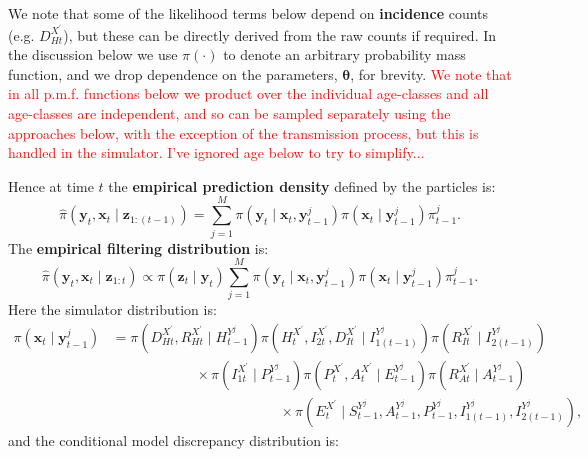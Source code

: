\documentclass[a4paper]{article}
\newcommand{\btheta}{\bm{\theta}}
\newcommand{\bx}{\bm{x}}
\newcommand{\by}{\bm{y}}
\newcommand{\bz}{\bm{z}}
\begin{document}
We note that some of the likelihood terms below depend on \textbf{incidence} counts (e.g. $D^{X^\prime}_{Ht}$), but these can be directly derived from the raw counts if required. In the discussion below we use $\pi\left(\cdot\right)$ to denote an arbitrary probability mass function, and we drop dependence on the parameters, $\btheta$, for brevity. \textcolor{red}{We note that in all p.m.f. functions below we product over the individual age-classes and all age-classes are independent, and so can be sampled separately using the approaches below, with the exception of the transmission process, but this is handled in the simulator. I've ignored age below to try to simplify...}

Hence at time $t$ the \textbf{empirical prediction density} defined by the particles is:
\begin{equation}
    \hat{\pi}\left(\by_t, \bx_t \mid \bz_{1:(t - 1)}\right) = \sum_{j = 1}^M \pi\left(\by_t \mid \bx_t, \by^j_{t - 1}\right)\pi\left(\bx_t \mid \by^j_{t - 1}\right)\pi^j_{t - 1}.
\end{equation}
The \textbf{empirical filtering distribution} is:
\begin{equation}
    \hat{\pi}\left(\by_t, \bx_t \mid \bz_{1:t}\right) \propto \pi\left(\bz_t \mid \by_t\right)\sum_{j = 1}^M \pi\left(\by_t \mid \bx_t, \by^j_{t - 1}\right)\pi\left(\bx_t \mid \by^j_{t - 1}\right)\pi^j_{t - 1}.
\end{equation}
Here the simulator distribution is:
\begin{align}
    \pi\left(\bx_t \mid \by^j_{t - 1}\right) &= \pi\left(D^{X^\prime}_{Ht}, R^{X^\prime}_{Ht} \mid H^{Y^j}_{t - 1}\right)\pi\left(H^{X^\prime}_t, I^{X^\prime}_{2t}, D^{X^\prime}_{It} \mid I^{Y^j}_{1(t - 1)}\right)\pi\left(R^{X^\prime}_{It} \mid I^{Y^j}_{2(t - 1)}\right)\nonumber\\
    & \qquad \qquad \qquad \times \pi\left(I^{X^\prime}_{1t} \mid P^{Y^j}_{t - 1}\right)\pi\left(P^{X^\prime}_t, A^{X^\prime}_t \mid E^{Y^j}_{t - 1}\right)\pi\left(R^{X^\prime}_{At} \mid A^{Y^j}_{t - 1} \right)\nonumber\\
    & \qquad \qquad \qquad \qquad \qquad \qquad \times \pi\left(E^{X^\prime}_t \mid S^{Y^j}_{t - 1}, A^{Y^j}_{t - 1}, P^{Y^j}_{t - 1}, I^{Y^j}_{1(t - 1)}, I^{Y^j}_{2(t - 1)}\right),\label{eq:simlike}
\end{align}
and the conditional model discrepancy distribution is:
\end{document}
